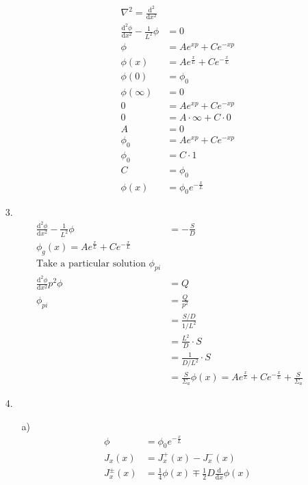 \documentclass{article}
\begin{document}
\begin{itemize}
\begin{itemize}
\begin{align*}
            \nabla^2=\frac{\text{d}^2}{\text{d}x^2}\\
            \frac{\text{d}^2\phi}{\text{d}x^2}-\frac{1}{L^2}\phi&=0\\
            \phi&=Ae^{xp}+Ce^{-xp}\\
            \phi(x)&=Ae^{\frac{x}{L}}+Ce^{-\frac{x}{L}}\\
            \phi(0)&=\phi_0\\
            \phi(\infty)&=0\\
            0&=Ae^{xp}+Ce^{-xp}\\
            0&=A\cdot\infty+C\cdot 0\\
            A&=0\\
            \phi_0&=Ae^{xp}+Ce^{-xp}\\
            \phi_0&=C\cdot 1\\
            C&=\phi_0\\
            \phi(x)&=\phi_0e^{-\frac{x}{L}}
        \end{align*}
    \end{itemize}
    \item [3.]
    \begin{align*}
        \frac{\text{d}^2\phi}{\text{d}x^2}-\frac{1}{L^2}\phi&=-\frac{S}{D}\\
        \phi_g(x)=Ae^{\frac{x}{L}}+Ce^{-\frac{x}{L}}\\
        \text{Take a particular solution }\phi_{pi}\\
        \frac{\text{d}^2\phi}{\text{d}x^2}p^2\phi&=Q\\
        \phi_{pi}&=\frac{Q}{p^2}\\
        &=\frac{S/D}{1/L^2}\\
        &=\frac{L^2}{D}\cdot S \\
        &= \frac{1}{D/L^2}\cdot S\\
        &= \frac{S}{\Sigma_a}
        \phi(x)=Ae^{\frac{x}{L}}+Ce^{-\frac{x}{L}}+\frac{S}{\Sigma_a}
    \end{align*}
    \newpage
    \item [4.]
    \begin{itemize}
        \item [a)]
        \begin{align*}
            \phi&=\phi_0e^{-\frac{x}{L}}\\
            J_x(x)&=J^+_x(x)-J^-_x(x)\\
            J^{\pm }_x(x)&=\frac{1}{4}\phi(x)\mp \frac{1}{2}D\frac{\text{d}}{\text{d}x}\phi(x)\\

\end{align*}
\end{itemize}
\end{itemize}
\end{document}
